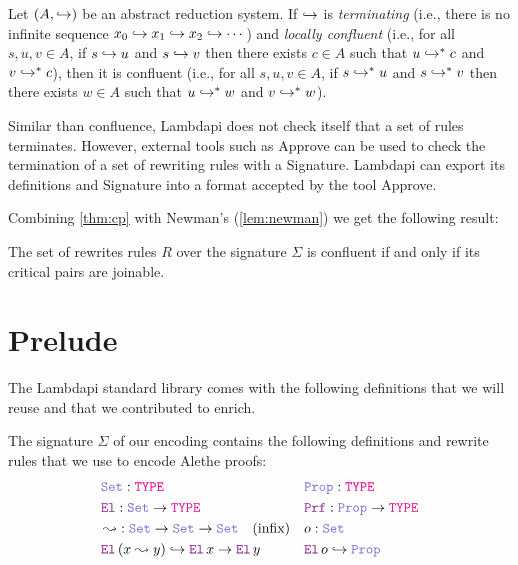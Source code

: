 \begin{lemma}\label{lem:newman}
Let $(A, \hookrightarrow)$ be an abstract reduction system. If $\hookrightarrow$ is \emph{terminating} (i.e., there is no infinite sequence 
$x_0 \hookrightarrow x_1 \hookrightarrow x_2 \hookrightarrow \cdots$) and \emph{locally confluent} (i.e., for all $s,u,v \in A$, if $s \hookrightarrow u$ and $s \hookrightarrow v$ then there exists 
$c \in A$ such that $u \hookrightarrow^{*} c$ and $v \hookrightarrow^{*} c$), then it is confluent (i.e., for all $s,u,v \in A$, if $s \hookrightarrow^{*} u$ and 
$s \hookrightarrow^{*} v$ then there exists $w \in A$ such that $u \hookrightarrow^{*} w$ and $v \hookrightarrow^{*} w$).
\end{lemma}

\begin{remark}
Similar than confluence, Lambdapi does not check itself that a set of rules terminates.
However, external tools such as Approve \cite{aprove} can be used to check the termination of a set of rewriting rules with a Signature.
Lambdapi can export its definitions and Signature into a format accepted by the tool Approve.
\end{remark}

Combining \cref{thm:cp} with Newman's (\cref{lem:newman}) we get the following result:

\begin{corollary}
The set of rewrites rules $R$ over the signature $\Sigma$ is confluent if and only if its critical pairs are joinable.
\end{corollary}

\section{Prelude}
\label{sec:prelude-lp}

The Lambdapi standard library comes with the following definitions that we will reuse and that we contributed to enrich.

\begin{definition}
\label{def:defuniv}
The signature $\Sigma$ of our encoding contains the following definitions and rewrite rules that we use to encode Alethe proofs:
\begin{align*}
&\set\index{\set}: \type & &\prop\index{\prop}: \type \\
&\index{\el{}} \el{}: \set \rightarrow \type  & &\index{\prf}\prf{} : \prop \rightarrow \type \\
&\mathop{\leadsto}\index{$\leadsto$}: \set \rightarrow \set \rightarrow \set \quad \text{(infix)} & &o: \set \\
&\el\,(x \leadsto y) \hookrightarrow \el\,x \rightarrow \el\,y & &\el\,o\index{o}  \hookrightarrow \prop
\end{align*}
\end{definition}

